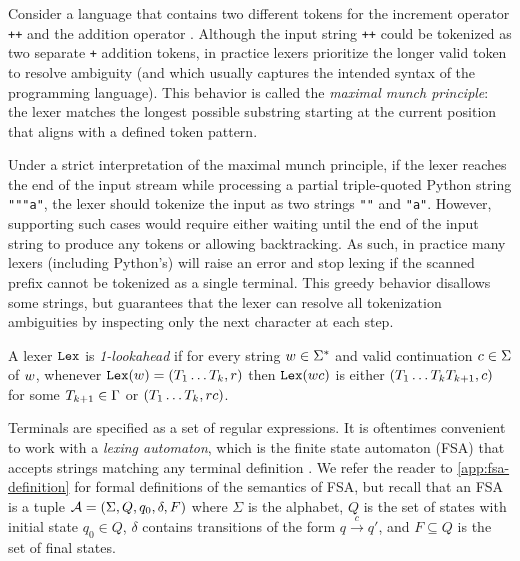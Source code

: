 Consider a language that contains two different tokens for the increment operator \texttt{++} and the addition operator \text{+}. 
% 
Although the input string \texttt{++} could be tokenized as two separate \texttt{+} addition tokens, in practice lexers prioritize the longer valid token to resolve ambiguity (and which usually captures the intended syntax of the programming language).
% 
This behavior is called the \emph{maximal munch principle}: the lexer matches the longest possible substring starting at the current position that aligns with a defined token pattern.

Under a strict interpretation of the maximal munch principle, if the lexer reaches the end of the input stream while processing a partial triple-quoted Python string \texttt{"""a"}, the lexer should tokenize the input as two strings \texttt{""} and \texttt{"a"}.
% 
However, supporting such cases would require either waiting until the end of the input string to produce any tokens or allowing backtracking.
% 
As such, in practice many lexers (including Python's) will raise an error and stop lexing if the scanned prefix cannot be tokenized as a single terminal.
% 
This greedy behavior disallows some strings, but guarantees that the lexer can resolve all tokenization ambiguities by inspecting only the next character at each step.

\begin{definition}[1-lookahead]
A lexer $\mathtt{Lex}$ is \emph{1-lookahead} if for every string $w \in \Sigma^\ast$ and valid continuation $c \in \Sigma$ of $w$, whenever $\mathtt{Lex}(w) = (T_1 \ldots T_k, r)$ then $\mathtt{Lex}(w c)$ is either $(T_1 \ldots T_k T_{k+1}, c)$ for some $T_{k+1} \in \Gamma$ or $(T_1 \ldots T_k, r c)$.
\end{definition}

Terminals are specified as a set of regular expressions. It is oftentimes convenient to work with a \textit{lexing automaton}, which is the finite state automaton (FSA) that accepts strings matching any terminal definition \cite{mcnaughton1960regular}.
We refer the reader to \autoref{app:fsa-definition} for formal definitions of the semantics of FSA, but recall that an FSA is a tuple $\mathcal{A} = (\Sigma, Q, q_0, \delta, F)$ where $\Sigma$ is the alphabet, $Q$ is the set of states with initial state $q_0\in Q$, $\delta$ contains transitions of the form $q \xrightarrow{c} q'$, and $F\subseteq Q$ is the set of final states.

